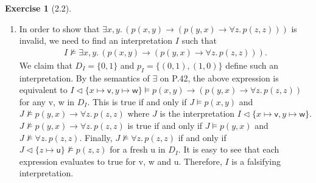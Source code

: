\documentclass[12pt, psamsfonts]{amsart}
\theoremstyle{definition}
\newtheorem*{exer}{Exercise}
\theoremstyle{remark}
\numberwithin{equation}{subsection}
\begin{document}
\begin{exer}[2.2]
\begin{enumerate}[label=(\alph*)]
\begin{enumerate}[label=\arabic*.]
               \item %
                   $I \vartriangleleft \{ y \mapsto \textsf{v} \} \not\models p(y)$ by 3 and semantics of $\exists$ on P.42 for the same $\textsf{v}$ as above.
               \item %
                   $I \models \bot$, contradiction as shown on P.43.
           \end{enumerate}
           Since every branch of a semantic argument proof of $I \not\models F$ closes, $F$ is valid by Theorem 2.30
        \item %
            In order to show that $\exists x, y.\, (p(x, y) \rightarrow (p(y, x) \rightarrow \forall z.\, p(z, z)))$ is invalid,
            we need to find an interpretation $I$ such that
            \begin{align*}
                I \not\models \exists x, y.\, (p(x, y) \rightarrow (p(y, x) \rightarrow \forall z.\, p(z, z))).
            \end{align*}
            We claim that $D_I = \{ 0, 1 \}$ and $p_I = \{ (0, 1), (1, 0) \}$ define such an interpretation.
            By the semantics of $\exists$ on P.42, the above expression is equivalent to $I \vartriangleleft \{ x \mapsto \textsf{v}, y \mapsto \textsf{w} \} \models p(x, y) \rightarrow (p(y, x) \rightarrow \forall z.\, p(z, z))$ for any \textsf{v}, \textsf{w} in $D_I$.
            This is true if and only if $J \models p(x, y)$ and $J \not\models p(y, x) \rightarrow \forall z.\, p(z, z)$ where $J$ is the interpretation $I \vartriangleleft \{ x \mapsto \textsf{v}, y \mapsto \textsf{w} \}$.
            $J \not\models p(y, x) \rightarrow \forall z.\, p(z, z)$ is true if and only if $J \models p(y, x)$ and $J \not\models \forall z.\, p(z, z)$.
            Finally, $J \not\models \forall z.\, p(z, z)$ if and only if $J \vartriangleleft \{ z \mapsto \textsf{u} \} \not\models p(z, z)$ for a fresh \textsf{u} in $D_I$.
            It is easy to see that each expression evaluates to true for \textsf{v}, \textsf{w} and \textsf{u}.
            Therefore, $I$ is a falsifying interpretation.
    \end{enumerate}
\end{exer}
\end{document}
